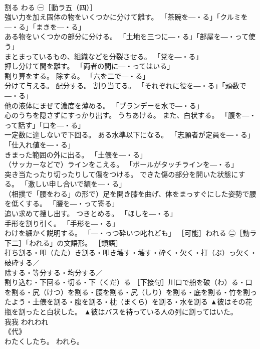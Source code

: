 \documentclass[8pt]{extreport}
\begin{document}
\begin{CJK}{UTF8}{min}
\\	割る	わる	㊀［動ラ五（四）］ 
\\	強い力を加え固体の物をいくつかに分けて離す。 「茶碗を―・る」「クルミを―・る」「まきを―・る」 
\\	ある物をいくつかの部分に分ける。 「土地を三つに―・る」「部屋を―・って使う」 
\\	まとまっているもの、組織などを分裂させる。 「党を―・る」 
\\	押し分けて間を離す。 「両者の間に―・ってはいる」 
\\	割り算をする。 除する。 「六を二で―・る」 
\\	分けて与える。 配分する。 割り当てる。 「それぞれに役を―・る」「頭数で―・る」 
\\	他の液体にまぜて濃度を薄める。 「ブランデーを水で―・る」 
\\	心のうちを隠さずにすっかり出す。 うちあける。 また、白状する。 「腹を―・って話す」「口を―・る」 
\\	一定数に達しないで下回る。 ある水準以下になる。 「志願者が定員を―・る」「仕入れ値を―・る」 
\\	きまった範囲の外に出る。 「土俵を―・る」 
\\	（サッカーなどで）ラインをこえる。 「ボールがタッチラインを―・る」 
\\	突き当たったり切ったりして傷をつける。 できた傷の部分を開いた状態にする。 「激しい申し合いで額を―・る」 
\\	（相撲で「腰をわる」の形で）足を開き膝を曲げ、体をまっすぐにした姿勢で腰を低くする。 「腰を―・って寄る」 
\\	追い求めて捜し出す。 つきとめる。 「ほしを―・る」 
\\	手形を割り引く。 「手形を―・る」 
\\	わけを細かく説明する。 「―・っつ砕いつ叱れども」 ［可能］われる ㊁［動ラ下二］「われる」の文語形。 ［類語］ 
\\	打ち割る・叩（たた）き割る・叩き壊す・壊す・砕く・欠く・打（ぶ）っ欠く・破砕する／
\\	除する・等分する・均分する／
\\	割り込む・下回る・切る・下（くだ）る ［下接句］川口で船を破（わ）る・口を割る・尻（けつ）を割る・腰を割る・尻（しり）を割る・底を割る・竹を割ったよう・土俵を割る・腹を割る・枕（まくら）を割る・水を割る	▲彼はその花瓶を割ったと白状した。 ▲彼はバスを待っている人の列に割ってはいた。
\\	我我	われわれ	
\\	｟代｠ 
\\	わたくしたち。 われら。 

\end{CJK}
\end{document}
